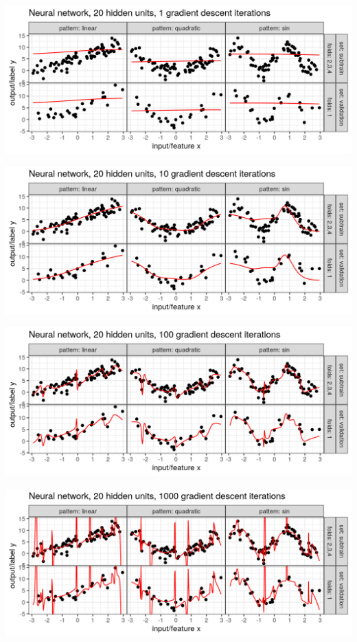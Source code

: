 
\begin{frame}
  \includegraphics[width=\textwidth]{figure-overfitting-pred-units=20-maxit=1.png}
\end{frame}


\begin{frame}
  \includegraphics[width=\textwidth]{figure-overfitting-pred-units=20-maxit=10.png}
\end{frame}


\begin{frame}
  \includegraphics[width=\textwidth]{figure-overfitting-pred-units=20-maxit=100.png}
\end{frame}


\begin{frame}
  \includegraphics[width=\textwidth]{figure-overfitting-pred-units=20-maxit=1000.png}
\end{frame}


